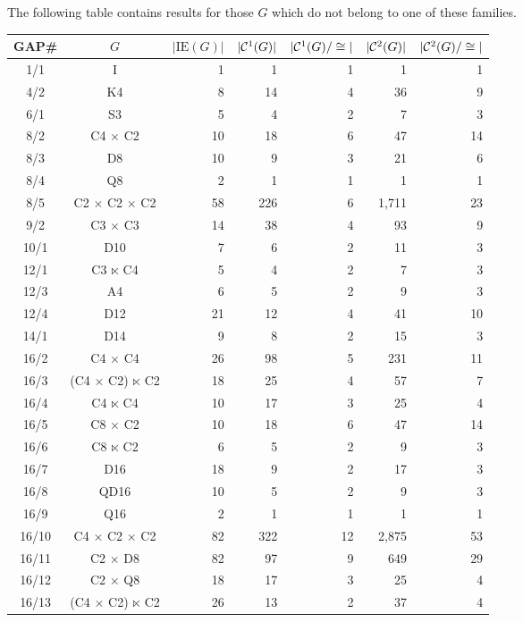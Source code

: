 \documentclass[a4paper,11pt]{article}
\theoremstyle{plain}
\theoremstyle{definition}
\begin{document}
The following table contains results for those $G$ which do not belong 
to one of these families. 
\begin{longtable}{ccrrrrr}
	\hline\hline
	{\textsf{GAP}}\# 
	    & $G$ 
	        & $|\mathrm{IE}(G)|$ 
	            & $|\mathcal{C}^1(G)|$ 
	                & $|\mathcal{C}^1(G)/\cong |$ 
	                    & $|\mathcal{C}^{2}(G)|$ 
	                        & $|\mathcal{C}^{2}(G)/\cong |$  \\ 
	\hline
	1/1 & I & 1 & 1 & 1 & 1 & 1 \\ 
	4/2 & K4 & 8 & 14 & 4 & 36 & 9 \\ 
	6/1 & S3 & 5 & 4 & 2 & 7 & 3 \\ 
	8/2 & C4 $\times$ C2 & 10 & 18 & 6 & 47 & 14 \\ 
	8/3 & D8 & 10 & 9 & 3 & 21 & 6 \\ 
	8/4 & Q8 & 2 & 1 & 1 & 1 & 1 \\ 
	8/5 & C2 $\times$ C2 $\times$ C2 & 58 & 226 & 6 & 1,711 & 23 \\ 
	9/2 & C3 $\times$ C3 & 14 & 38 & 4 & 93 & 9 \\ 
	10/1 & D10 & 7 & 6 & 2 & 11 & 3 \\ 
	12/1 & C3 $\ltimes$ C4 & 5 & 4 & 2 & 7 & 3 \\ 
	12/3 & A4 & 6 & 5 & 2 & 9 & 3 \\ 
	12/4 & D12 & 21 & 12 & 4 & 41 & 10 \\ 
	14/1 & D14 & 9 & 8 & 2 & 15 & 3 \\ 
	16/2 & C4 $\times$ C4 & 26 & 98 & 5 & 231 & 11 \\ 
	16/3 & (C4 $\times$ C2) $\ltimes$ C2 & 18 & 25 & 4 & 57 & 7 \\ 
	16/4 & C4 $\ltimes$ C4 & 10 & 17 & 3 & 25 & 4 \\ 
	16/5 & C8 $\times$ C2 & 10 & 18 & 6 & 47 & 14 \\ 
	16/6 & C8 $\ltimes$ C2 & 6 & 5 & 2 & 9 & 3 \\ 
	16/7 & D16 & 18 & 9 & 2 & 17 & 3 \\ 
	16/8 & QD16 & 10 & 5 & 2 & 9 & 3 \\ 
	16/9 & Q16 & 2 & 1 & 1 & 1 & 1 \\ 
	16/10 & C4 $\times$ C2 $\times$ C2 & 82 & 322 & 12 & 2,875 & 53 \\ 
	16/11 & C2 $\times$ D8 & 82 & 97 & 9 & 649 & 29 \\ 
	16/12 & C2 $\times$ Q8 & 18 & 17 & 3 & 25 & 4 \\ 
	16/13 & (C4 $\times$ C2) $\ltimes$ C2 & 26 & 13 & 2 & 37 & 4 \\ 

\end{longtable}
\end{document}

